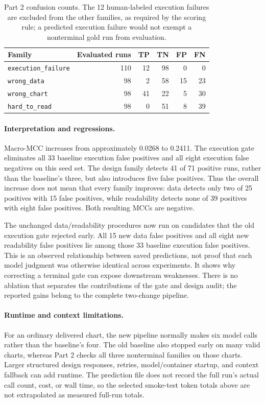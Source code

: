 \documentclass[11pt]{article}
\begin{document}
\begin{table}[htbp]
\centering
\small
\begin{tabular}{lrrrrr}
\toprule
Family & Evaluated runs & TP & TN & FP & FN \\
\midrule
\texttt{execution\_failure} & 110 & 12 & 98 & 0 & 0 \\
\texttt{wrong\_data}        & 98  & 2  & 58 & 15 & 23 \\
\texttt{wrong\_chart}       & 98  & 41 & 22 & 5 & 30 \\
\texttt{hard\_to\_read}     & 98  & 0  & 51 & 8 & 39 \\
\bottomrule
\end{tabular}
\caption{Part 2 confusion counts. The 12 human-labeled execution failures are
excluded from the other families, as required by the scoring rule; a predicted
execution failure would not exempt a nonterminal gold run from evaluation.}
\label{tab:part2-confusion}
\end{table}

\paragraph{Interpretation and regressions.}
Macro-MCC increases from approximately 0.0268 to 0.2411. The execution gate
eliminates all 33 baseline execution false positives and all eight execution
false negatives on this seed set. The design family detects 41 of 71 positive
runs, rather than the baseline's three, but also introduces five false
positives. Thus the overall increase does not mean that every family improves:
data detects only two of 25 positives with 15 false positives, while readability
detects none of 39 positives with eight false positives. Both resulting MCCs
are negative.

The unchanged data/readability procedures now run on candidates that the old
execution gate rejected early. All 15 new data false positives and all eight
new readability false positives lie among those 33 baseline execution false
positives. This is an observed relationship between saved predictions, not
proof that each model judgment was otherwise identical across experiments.
It shows why correcting a terminal gate can expose downstream weaknesses.
There is no ablation that separates the contributions of the gate and design
audit; the reported gains belong to the complete two-change pipeline.

\paragraph{Runtime and context limitations.}
For an ordinary delivered chart, the new pipeline normally makes six model
calls rather than the baseline's four. The old baseline also stopped early
on many valid charts, whereas Part 2 checks all three nonterminal families
on those charts. Larger structured design responses, retries, model/container
startup, and context fallback can add runtime. The prediction file does not
record the full run's actual call count, cost, or wall time, so the selected
smoke-test token totals above are not extrapolated as measured full-run totals.
\end{document}
